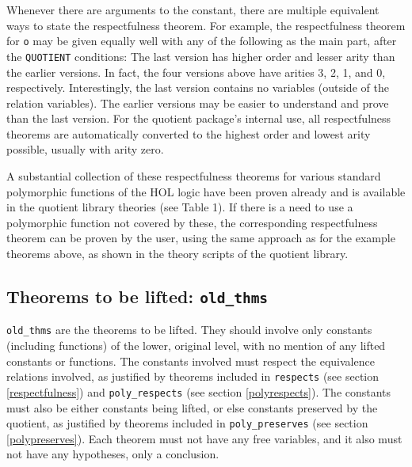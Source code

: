 \documentclass[envcountsame,runningheads]{llncs}
\begin{document}
Whenever there are arguments to the constant, there are
multiple equivalent ways to state the respectfulness theorem.
For example, the respectfulness theorem for {\tt o} may be given
equally well with any of the following as the main part, after the
{\tt QUOTIENT} conditions:
The last version has higher order and lesser arity than the
earlier versions.  In fact, the four versions above have arities
3, 2, 1, and 0, respectively.
Interestingly, the last version contains no variables (outside of the
relation variables).
The earlier versions may be easier to understand and prove than the
last version.  For the quotient package's internal use, all respectfulness
theorems are automatically converted to the highest order and lowest
arity possible, usually with arity zero.

A substantial collection of these respectfulness theorems for various
standard polymorphic functions of the HOL logic have been proven already and
is available in the quotient library theories (see Table 1).
If there is a need to use a
polymorphic function not covered by these, the corresponding respectfulness
theorem can be proven by the user, using the same approach as for the example
theorems above, as shown in the theory scripts of the quotient library.


%
\subsection{Theorems to be lifted: {\tt old\_thms}}
%
\label{oldtheorem}

{\tt old\_thms} are the theorems to be lifted.  They should involve only
constants (including functions) of the lower, original level,
with no mention of any lifted constants or functions.
The constants involved must respect
the equivalence relations involved,
as justified by theorems included
in {\tt respects} (see section \ref{respectfulness})
and {\tt poly\_respects} (see section \ref{polyrespects}).
The constants must also be either constants being lifted, or else constants
preserved by the quotient, as justified by theorems included in
{\tt poly\_preserves} (see section \ref{polypreserves}).
Each theorem must not have any free variables, and it also must not
have any hypotheses, only a conclusion.
\end{document}
